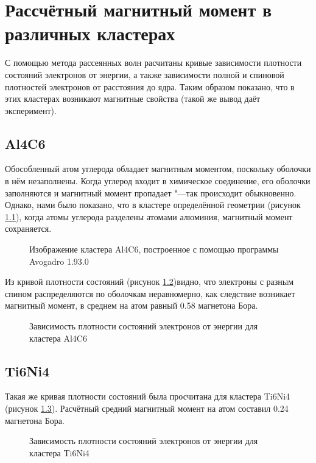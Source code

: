\chapter{\textbf{Рассчётный магнитный момент в различных кластерах}}\label{ch:results}
С помощью метода рассеянных волн расчитаны кривые зависимости плотности состояний электронов от энергии, а также
зависимости полной и спиновой плотностей электронов от расстояния до ядра. Таким образом показано, что в этих кластерах
возникают магнитные свойства (такой же вывод даёт эксперимент).

\section{\textbf{Al4C6}}\label{sec:results/al4c6}
Обособленный атом углерода обладает магнитным моментом, поскольку оболочки в нём незаполнены. Когда углерод
входит в химическое соединение, его оболочки заполняются и магнитный момент пропадает "---так происходит обыкновенно.
Однако, нами было показано, что в кластере определённой геометрии (рисунок \cref{fig:al4c6}), когда атомы углерода разделены
атомами алюминия, магнитный момент сохраняется.

\begin{figure}[ht]
  \centerfloat{
    \texttt{[image: al4c6]}
  }
  \caption{Изображение кластера Al4C6, построенное с помощью программы Avogadro 1.93.0\cite{Hanwell2012}}
  \label{fig:al4c6}
\end{figure}

Из кривой плотности состояний (рисунок \cref{fig:al4c6-spectrum})видно, что электроны с разным спином распределяются по
оболочкам неравномерно, как следствие возникает магнитный момент, в среднем на атом равный 0.58 магнетона Бора.
\begin{figure}[ht]
  \caption{Зависимость плотности состояний электронов от энергии для кластера Al4C6}
  \label{fig:al4c6-spectrum}
\end{figure}

\section{\textbf{Ti6Ni4}}\label{sec:results/ti6ni4}
Такая же кривая плотности состояний была просчитана для кластера Ti6Ni4 (рисунок \cref{fig:ti6ni4-spectrum}). Расчётный
средний магнитный момент на атом составил 0.24 магнетона Бора.
\begin{figure}[ht]
  \caption{Зависимость плотности состояний электронов от энергии для кластера Ti6Ni4}
  \label{fig:ti6ni4-spectrum}
\end{figure}


